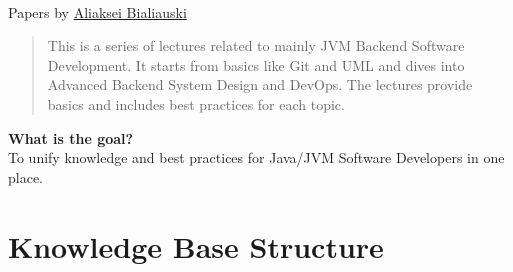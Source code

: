 \documentclass[nobrand,anonymous,nodate,nosecurity]{huawei}
\begin{document}
{\\
Papers by \href{h1alexbel.github.io/about-me.html}{Aliaksei Bialiauski}

\begin{abstract}
This is a series of lectures related to mainly JVM Backend Software Development.
It starts from basics like Git and UML and dives into Advanced Backend System Design and DevOps. The lectures provide basics and includes best practices for each topic.
\end{abstract}

\textbf{What is the goal?}\\
To unify knowledge and best practices for Java/JVM Software Developers in one place.
\section*{Knowledge Base Structure}

}
\end{document}
